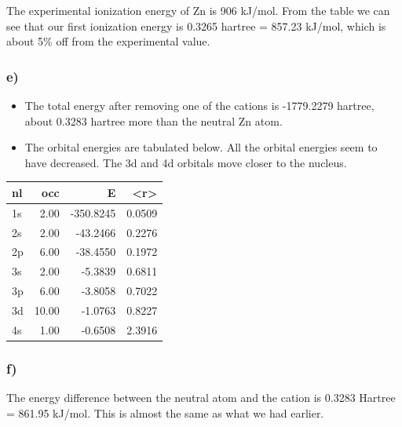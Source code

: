 \documentclass[11pt]{article}
\begin{document}
The experimental ionization energy of Zn is 906 kJ/mol. From the table we can see that our first ionization energy is 0.3265 hartree = 857.23 kJ/mol, which is about 5\% off from the experimental value. 

\subsubsection{e)}
\label{sec-2-1-5}

\begin{itemize}
\item The total energy after removing one of the cations is -1779.2279 hartree, about 0.3283 hartree more than the neutral Zn atom.

\item The orbital energies are tabulated below. All the orbital energies seem to have decreased. The 3d and 4d orbitals move closer to the nucleus.
\end{itemize}

\begin{center}
\begin{tabular}{lrrr}
nl & occ & E & <r>\\
\hline
1s & 2.00 & -350.8245 & 0.0509\\
2s & 2.00 & -43.2466 & 0.2276\\
2p & 6.00 & -38.4550 & 0.1972\\
3s & 2.00 & -5.3839 & 0.6811\\
3p & 6.00 & -3.8058 & 0.7022\\
3d & 10.00 & -1.0763 & 0.8227\\
4s & 1.00 & -0.6508 & 2.3916\\
\end{tabular}
\end{center}

\subsubsection{f)}
\label{sec-2-1-6}

The energy difference between the neutral atom and the cation is 0.3283 Hartree = 861.95 kJ/mol. This is almost the same as what we had earlier.
\end{document}
